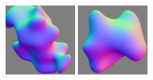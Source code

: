 \begin{subfigure}[t]{0.47\textwidth}
    \includegraphics[width=0.235\textwidth]{ch-psfcn/images/Dataset/simple/blob08_s-0.80_x-250_y-250_normal.png}
    \includegraphics[width=0.235\textwidth]{ch-psfcn/images/Dataset/simple/blob07_s-0.90_x-250_y-250_normal.png}\\
    \end{subfigure}
    \quad
